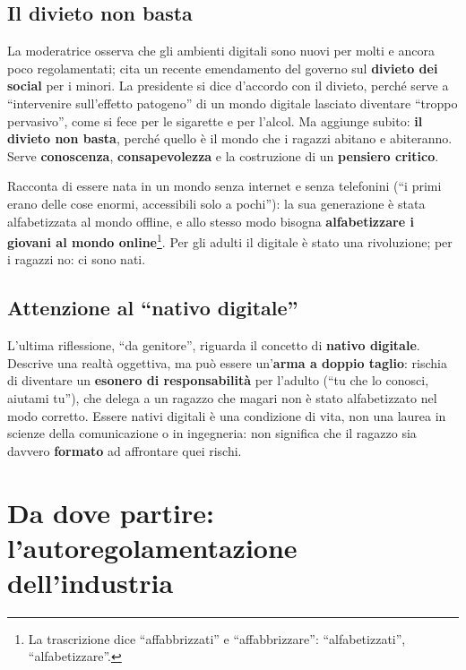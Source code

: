 \subsection{Il divieto non basta}

La moderatrice osserva che gli ambienti digitali sono nuovi per molti e ancora
poco regolamentati; cita un recente emendamento del governo sul
\textbf{divieto dei social} per i minori. La presidente si dice d'accordo con il
divieto, perché serve a ``intervenire sull'effetto patogeno'' di un mondo
digitale lasciato diventare ``troppo pervasivo'', come si fece per le sigarette
e per l'alcol. Ma aggiunge subito: \textbf{il divieto non basta}, perché quello
è il mondo che i ragazzi abitano e abiteranno. Serve
\textbf{conoscenza}, \textbf{consapevolezza} e la costruzione di un
\textbf{pensiero critico}.

Racconta di essere nata in un mondo senza internet e senza telefonini (``i primi
erano delle cose enormi, accessibili solo a pochi''): la sua generazione è stata
alfabetizzata al mondo offline, e allo stesso modo bisogna
\textbf{alfabetizzare i giovani al mondo online}\footnote{La trascrizione dice
``affabbrizzati'' e ``affabbrizzare'': ``alfabetizzati'',
``alfabetizzare''.}. Per gli adulti il digitale è stato una rivoluzione; per i
ragazzi no: ci sono nati.

\subsection{Attenzione al ``nativo digitale''}

L'ultima riflessione, ``da genitore'', riguarda il concetto di \textbf{nativo
digitale}. Descrive una realtà oggettiva, ma può essere un'\textbf{arma a doppio
taglio}: rischia di diventare un \textbf{esonero di responsabilità} per l'adulto
(``tu che lo conosci, aiutami tu''), che delega a un ragazzo che magari non è
stato alfabetizzato nel modo corretto. Essere nativi digitali è una condizione
di vita, non una laurea in scienze della comunicazione o in ingegneria: non
significa che il ragazzo sia davvero \textbf{formato} ad affrontare quei rischi.

\section{Da dove partire: l'autoregolamentazione dell'industria}
\label{sec:c1-1-autoregolazione}

